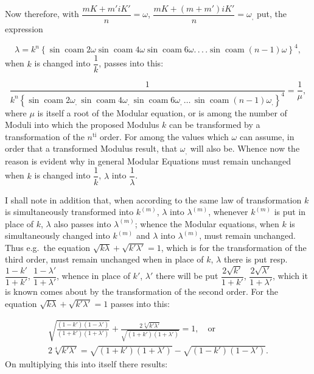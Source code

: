 \documentclass{article}
\begin{document}

Now therefore, with $\dfrac{mK+m'iK'}{n}=\omega$, $\dfrac{mK+(m+m')iK'}{n}=\omega_{,}$ put, the expression

\[
\lambda=k^{n}\left\{\sin\operatorname{coam}2\omega\sin\operatorname{coam}4\omega\sin\operatorname{coam}6\omega.\,.\,.\,.\sin\operatorname{coam}(n-1)\omega\right\}^{4},
\]
when $k$ is changed into $\dfrac{1}{k}$, passes into this:

\[
\frac{1}{k^{n}\left\{\sin\operatorname{coam}2\omega_{,}\,\sin\operatorname{coam}4\omega_{,}\,\sin\operatorname{coam}6\omega_{,}\,\ldots\,\sin\operatorname{coam}(n-1)\omega_{,}\right\}^{4}}=\frac{1}{\mu},
\]
where $\mu$ is itself a root of the Modular equation, or is among the number of Moduli into which the proposed Modulus $k$ can be transformed by a transformation of the $n^{\mathrm{ti}}$ order. For among the values which $\omega$ can assume, in order that a transformed Modulus result, that $\omega_{,}$ will also be. Whence now the reason is evident why in general Modular Equations must remain unchanged when $k$ is changed into $\dfrac{1}{k}$, $\lambda$ into $\dfrac{1}{\lambda}$.

I shall note in addition that, when according to the same law of transformation $k$ is simultaneously transformed into $k^{(m)}$, $\lambda$ into $\lambda^{(m)}$, whenever $k^{(m)}$ is put in place of $k$, $\lambda$ also passes into $\lambda^{(m)}$; whence the Modular equations, when $k$ is simultaneously changed into $k^{(m)}$ and $\lambda$ into $\lambda^{(m)}$, must remain unchanged. Thus e.g.\ the equation $\sqrt{k\lambda}+\sqrt{k'\lambda'}=1$, which is for the transformation of the third order, must remain unchanged when in place of $k$, $\lambda$ there is put resp.\ $\dfrac{1-k'}{1+k'}$, $\dfrac{1-\lambda'}{1+\lambda'}$, whence in place of $k'$, $\lambda'$ there will be put $\dfrac{2\sqrt{k'}}{1+k'}$, $\dfrac{2\sqrt{\lambda'}}{1+\lambda'}$, which it is known comes about by the transformation of the second order.
For the equation $\sqrt{k\lambda}+\sqrt{k'\lambda'}=1$ passes into this:

\[
\begin{gathered}
\sqrt{\frac{(1-k')(1-\lambda')}{(1+k')(1+\lambda')}}+\frac{2\sqrt[4]{k'\lambda'}}{\sqrt{(1+k')(1+\lambda')}}=1,\quad\text{or}\\[1.5ex]
2\sqrt[4]{k'\lambda'}=\sqrt{(1+k')(1+\lambda')}-\sqrt{(1-k')(1-\lambda')}.
\end{gathered}
\]
On multiplying this into itself there results:
\end{document}
